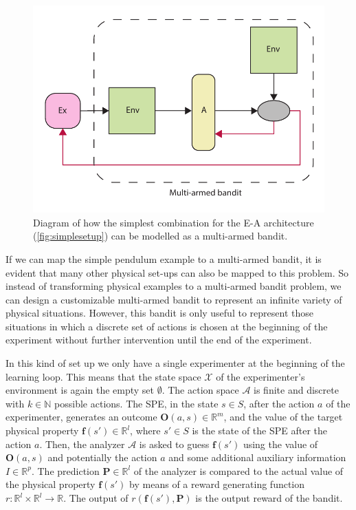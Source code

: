 \documentclass[11pt,a4paper,twoside]{report}
\newcommand{\+}{\textnormal{+} }
\theoremstyle{definition}
\numberwithin{equation}{chapter}
\begin{document}
\begin{figure}
  \centering 
\includegraphics[scale=0.75]{figures/Bandit-EA.pdf}
\caption{Diagram of how the simplest combination for the E-A architecture
(\ref{fig:simplesetup}) can be modelled as a multi-armed bandit.}
\label{fig:Bandit-EA}
\end{figure}



\par If we can map the simple pendulum example to a multi-armed bandit, it is
evident that many other physical set-ups can also be mapped to this problem. So
instead of transforming physical examples to a multi-armed bandit problem, we
can design a customizable multi-armed bandit to represent an infinite variety of
physical situations. However, this bandit is only useful to represent those
situations in which a discrete set of actions is chosen at the beginning of the
experiment without further intervention until the end of the experiment.

In this kind of set up we only have a single experimenter at the beginning of
the learning loop. This means that the state space $\mathcal{X}$  of the
experimenter's environment is again the empty set $\emptyset$. The action space
$\mathcal{A}$ is finite and discrete with $k \in \mathbb{N}$ possible actions.
The SPE, in the state $s \in S$, after the action $a$ of the experimenter,
generates an outcome $\textbf{O}(a,s) \in \mathbb{R}^m$, and the value of the
target physical property $\textbf{f}(s') \in \mathbb{R}^l$, where $s' \in S$ is
the state of the SPE after the action $a$. Then, the analyzer $\mathscr{A}$ is
asked to guess $\textbf{f}(s')$ using the value of $\textbf{O}(a,s)$ and
potentially the action $a$ and some additional auxiliary information $I \in
\mathbb{R}^{p}$. The prediction $\textbf{P} \in \mathbb{R}^l$ of the analyzer is
compared to the actual value of the physical property $\textbf{f}(s')$ by means
of a reward generating function
$r:\mathbb{R}^l\times\mathbb{R}^l\rightarrow\mathbb{R}$. The output of
$r(\textbf{f}(s'),\textbf{P})$ is the output reward of the bandit.
\end{document}
